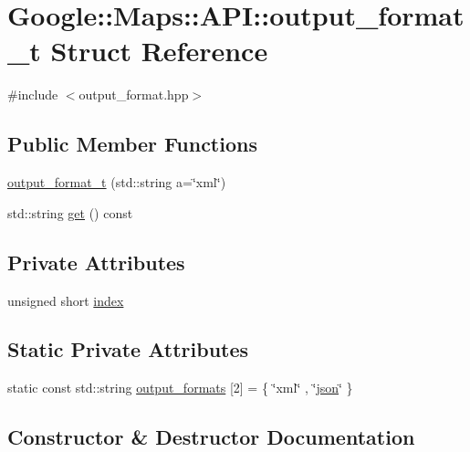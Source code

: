 \hypertarget{a00048}{}\section{Google\+:\+:Maps\+:\+:A\+PI\+:\+:output\+\_\+format\+\_\+t Struct Reference}
\label{a00048}


{\ttfamily \#include $<$output\+\_\+format.\+hpp$>$}

\subsection*{Public Member Functions}
\begin{DoxyCompactItemize}
\item 
\hyperlink{a00048_aee4b4f5757c465e4fdb7398a286daa57}{output\+\_\+format\+\_\+t} (std\+::string a=\char`\"{}xml\char`\"{})
\item 
std\+::string \hyperlink{a00048_a1cb355bdc5f1900bfd3ed472878eab4e}{get} () const
\end{DoxyCompactItemize}
\subsection*{Private Attributes}
\begin{DoxyCompactItemize}
\item 
unsigned short \hyperlink{a00048_a87d5d317a7e36a668ebb0316c794cb90}{index}
\end{DoxyCompactItemize}
\subsection*{Static Private Attributes}
\begin{DoxyCompactItemize}
\item 
static const std\+::string \hyperlink{a00048_a53d106f6d688b90fcf744fd3764a73ab}{output\+\_\+formats} \mbox{[}2\mbox{]} = \{ \char`\"{}xml\char`\"{} , \char`\"{}\hyperlink{a00011_ab701e3ac61a85b337ec5c1abaad6742d}{json}\char`\"{} \}
\end{DoxyCompactItemize}


\subsection{Constructor \& Destructor Documentation}
\mbox{\label{a00048_aee4b4f5757c465e4fdb7398a286daa57}} 
